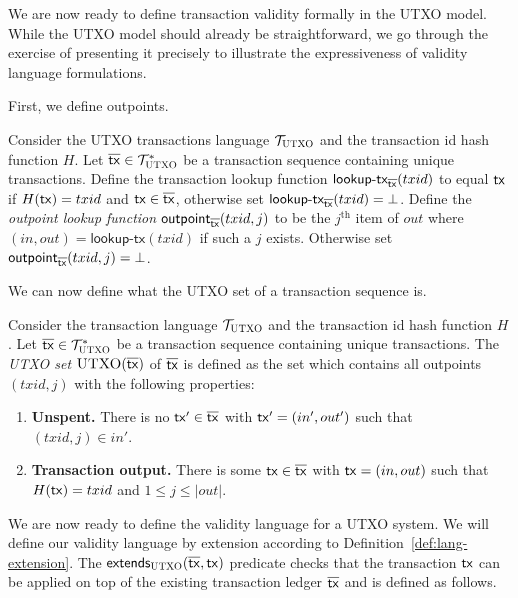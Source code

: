 We are now ready to define transaction validity formally in the UTXO model.
While the UTXO model should already be straightforward, we go through the
exercise of presenting it precisely to illustrate the expressiveness of validity
language formulations.

First, we define outpoints.

\begin{definition}[Outpoint]
  Consider the UTXO transactions language $\mathcal{T}_{\textsc{UTXO}}$ and the transaction id
  hash function $H$.
  Let $\overline{\mathsf{tx}} \in \mathcal{T}_{\textsc{UTXO}}^*$ be a transaction sequence
  containing unique transactions.
  Define the transaction lookup function
  $\textsf{lookup-tx}_{\overline{\mathsf{tx}}}(txid)$ to equal $\mathsf{tx}$ if $H(\mathsf{tx}) = txid$ and
  $\mathsf{tx} \in \overline{\mathsf{tx}}$, otherwise set $\textsf{lookup-tx}_{\overline{\mathsf{tx}}}(txid) = \bot$.
  Define the \emph{outpoint lookup function}
  $\textsf{outpoint}_{\overline{\mathsf{tx}}}(txid, j)$ to be the $j^\text{th}$ item of $out$ where
  $(in, out) = \textsf{lookup-tx}(txid)$ if such a $j$ exists. Otherwise
  set $\textsf{outpoint}_{\overline{\mathsf{tx}}}(txid, j) = \bot$.
\end{definition}

We can now define what the UTXO set of a transaction sequence is.

\begin{definition}
  Consider the transaction language $\mathcal{T}_{\textsc{UTXO}}$ and the transaction
  id hash function $H$. Let
  $\overline{\mathsf{tx}} \in \mathcal{T}_{\textsc{UTXO}}^*$ be a transaction sequence containing
  unique transactions.
  The \emph{UTXO set} $\textsc{UTXO}(\overline{\mathsf{tx}})$ of $\overline{\mathsf{tx}}$ is defined as
  the set which contains all outpoints $(txid, j)$ with the following properties:

  \begin{enumerate}
    \item \textbf{Unspent.}
          There is no $\mathsf{tx}' \in \overline{\mathsf{tx}}$ with $\mathsf{tx}' = (in', out')$ such that
          $(txid, j) \in in'$.
    \item \textbf{Transaction output.}
          There is some $\mathsf{tx} \in \overline{\mathsf{tx}}$ with $\mathsf{tx} = (in, out)$
          such that $H(\mathsf{tx}) = txid$ and $1 \leq j \leq |out|$.
  \end{enumerate}
\end{definition}

We are now ready to define the validity language for a UTXO system. We will
define our validity language by extension according to
Definition~\ref{def:lang-extension}.
The $\textsf{extends}_{\textsc{UTXO}}(\overline{\mathsf{tx}}, \mathsf{tx})$ predicate checks that
the transaction $\mathsf{tx}$ can be applied on top of the existing transaction ledger
$\overline{\mathsf{tx}}$ and is defined as follows.

